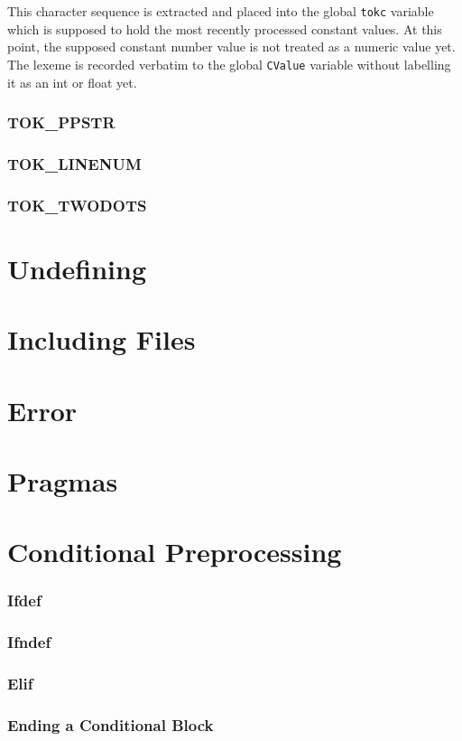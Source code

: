 This character sequence is extracted and placed into the global \verb|tokc| variable which is supposed to hold the most recently processed constant values. At this point, the supposed constant number value is not treated as a numeric value yet. The lexeme is recorded verbatim to the global \verb|CValue| variable without labelling it as an int or float yet.


\subsubsection{TOK\_PPSTR}
\subsubsection{TOK\_LINENUM}
\subsubsection{TOK\_TWODOTS}






\section{Undefining}

\section{Including Files}

\section{Error}

\section{Pragmas}

\section{Conditional Preprocessing}

\subsubsection{Ifdef}
\subsubsection{Ifndef}
\subsubsection{Elif}

\subsubsection{Ending a Conditional Block}


